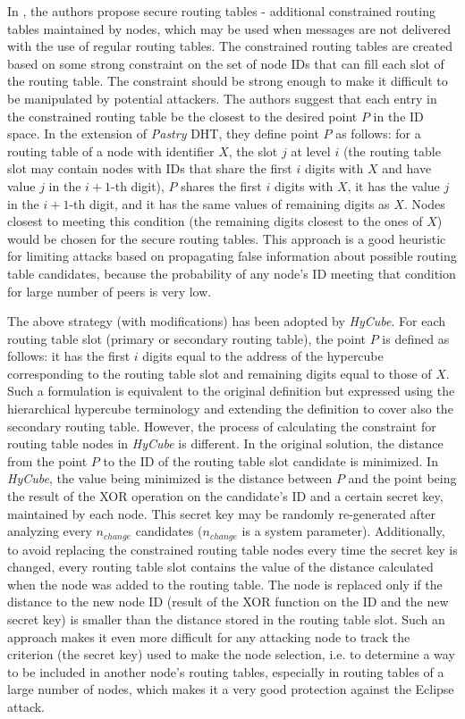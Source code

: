 In \cite{secrouting1}, the authors propose secure routing tables - additional constrained routing tables maintained by nodes, which may be used when messages are not delivered with the use of regular routing tables. The constrained routing tables are created based on some strong constraint on the set of node IDs that can fill each slot of the routing table. The constraint should be strong enough to make it difficult to be manipulated by potential attackers. The authors suggest that each entry in the constrained routing table be the closest to the desired point $P$ in the ID space. In the extension of \emph{Pastry} DHT, they define point $P$ as follows: for a routing table of a node with identifier $X$, the slot $j$ at level $i$ (the routing table slot may contain nodes with IDs that share the first $i$ digits with $X$ and have value $j$ in the $i+1$-th digit), $P$ shares the first $i$ digits with $X$, it has the value $j$ in the $i+1$-th digit, and it has the same values of remaining digits as $X$. Nodes closest to meeting this condition (the remaining digits closest to the ones of $X$) would be chosen for the secure routing tables. This approach is a good heuristic for limiting attacks based on propagating false information about possible routing table candidates, because the probability of any node's ID meeting that condition for large number of peers is very low.

The above strategy (with modifications) has been adopted by \emph{HyCube}. For each routing table slot (primary or secondary routing table), the point $P$ is defined as follows: it has the first $i$ digits equal to the address of the hypercube corresponding to the routing table slot and remaining digits equal to those of $X$. Such a formulation is equivalent to the original definition but expressed using the hierarchical hypercube terminology and extending the definition to cover also the secondary routing table. However, the process of calculating the constraint for routing table nodes in \emph{HyCube} is different. In the original solution, the distance from the point $P$ to the ID of the routing table slot candidate is minimized. In \emph{HyCube}, the value being minimized is the distance between $P$ and the point being the result of the XOR operation on the candidate's ID and a certain secret key, maintained by each node. This secret key may be randomly re-generated after analyzing every $n_{change}$ candidates ($n_{change}$ is a system parameter). Additionally, to avoid replacing the constrained routing table nodes every time the secret key is changed, every routing table slot contains the value of the distance calculated when the node was added to the routing table. The node is replaced only if the distance to the new node ID (result of the XOR function on the ID and the new secret key) is smaller than the distance stored in the routing table slot. Such an approach makes it even more difficult for any attacking node to track the criterion (the secret key) used to make the node selection, i.e. to determine a way to be included in another node's routing tables, especially in routing tables of a large number of nodes, which makes it a very good protection against the Eclipse attack.

